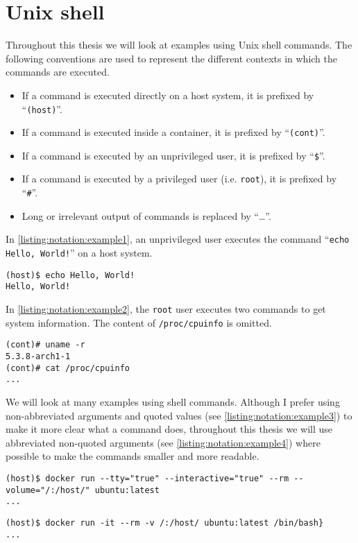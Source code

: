 \section{Unix shell}
Throughout this thesis we will look at examples using Unix shell commands. The following conventions are used to represent the different contexts in which the commands are executed.

\begin{itemize}
    \item If a command is executed directly on a host system, it is prefixed by ``\lstinline{(host)}''.
    \item If a command is executed inside a container, it is prefixed by ``\lstinline{(cont)}''.
    \item If a command is executed by an unprivileged user, it is prefixed by ``\lstinline{$}''.
    \item If a command is executed by a privileged user (i.e. \lstinline{root}), it is prefixed by ``\lstinline{#}''.
    \item Long or irrelevant output of commands is replaced by ``\ldots''.
\end{itemize}

In \autoref{listing:notation:example1}, an unprivileged user executes the command ``\lstinline{echo Hello, World!}'' on a host system.
\begin{lstlisting}[caption={Shell command notation example 1.}, captionpos=b, label={listing:notation:example1}]
(host)$ echo Hello, World!
Hello, World!
\end{lstlisting}

\medskip

In \autoref{listing:notation:example2}, the \lstinline{root} user executes two commands to get system information. The content of \lstinline{/proc/cpuinfo} is omitted.
\begin{lstlisting}[caption={Shell command notation example 2.}, captionpos=b, label={listing:notation:example2}]
(cont)# uname -r
5.3.8-arch1-1
(cont)# cat /proc/cpuinfo
...
\end{lstlisting}

\medskip

We will look at many examples using shell commands. Although I prefer using non-abbreviated arguments and quoted values (see \autoref{listing:notation:example3}) to make it more clear what a command does, throughout this thesis we will use abbreviated non-quoted arguments (see \autoref{listing:notation:example4}) where possible to make the commands smaller and more readable.

\begin{lstlisting}[caption={Abbreviated non-quoted command example.}, captionpos=b, label={listing:notation:example3}]
(host)$ docker run --tty="true" --interactive="true" --rm --volume="/:/host/" ubuntu:latest
...
\end{lstlisting}

\begin{lstlisting}[caption={Non-abbreviated quoted command example.}, captionpos=b, label={listing:notation:example4}]
(host)$ docker run -it --rm -v /:/host/ ubuntu:latest /bin/bash}
...
\end{lstlisting}
